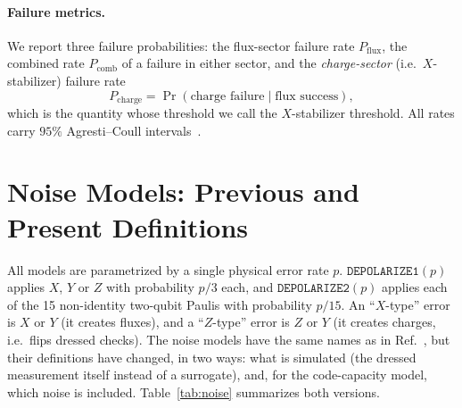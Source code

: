 \documentclass[a4paper]{article}
\begin{document}
\paragraph{Failure metrics.}
We report three failure probabilities: the flux-sector failure rate $P_{\mathrm{flux}}$, the combined rate $P_{\mathrm{comb}}$ of a failure in either sector, and the \emph{charge-sector} (i.e.\ $X$-stabilizer) failure rate
\begin{equation}
  P_{\mathrm{charge}}=\Pr(\text{charge failure}\mid\text{flux success}),
\end{equation}
which is the quantity whose threshold we call the $X$-stabilizer threshold. All rates carry $95\%$ Agresti--Coull intervals~\cite{agresti1998}.

\section{Noise Models: Previous and Present Definitions}
\label{sec:noise}

All models are parametrized by a single physical error rate $p$. $\mathtt{DEPOLARIZE1}(p)$ applies $X$, $Y$ or $Z$ with probability $p/3$ each, and $\mathtt{DEPOLARIZE2}(p)$ applies each of the 15 non-identity two-qubit Paulis with probability $p/15$. An ``$X$-type'' error is $X$ or $Y$ (it creates fluxes), and a ``$Z$-type'' error is $Z$ or $Y$ (it creates charges, i.e.\ flips dressed checks). The noise models have the same names as in Ref.~\cite{haga2026aqis}, but their definitions have changed, in two ways: what is simulated (the dressed measurement itself instead of a surrogate), and, for the code-capacity model, which noise is included. Table~\ref{tab:noise} summarizes both versions.
\end{document}
